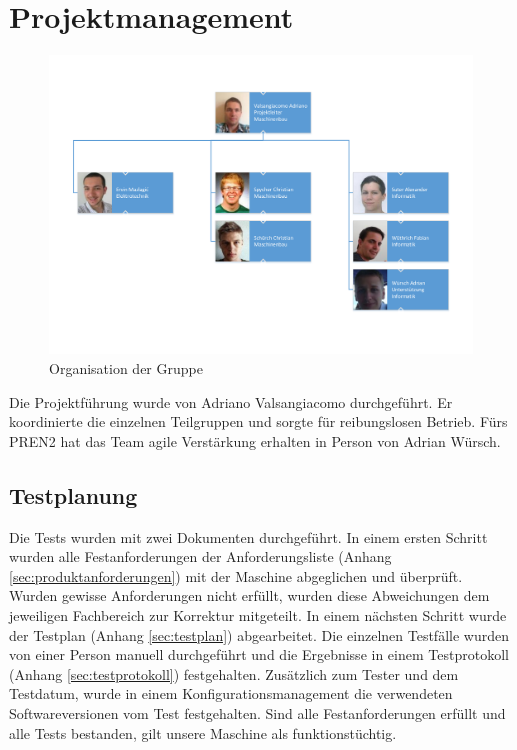 \section{Projektmanagement}

\begin{figure}[h!]
	\centering
	\includegraphics[width=1.0\linewidth]{../../fig/Organigramm.pdf}
	\caption{Organisation der Gruppe}
	\label{fig:Organigramm}
\end{figure}

\noindent
Die Projektführung wurde von Adriano Valsangiacomo durchgeführt. Er
koordinierte die einzelnen Teilgruppen und sorgte für reibungslosen
Betrieb. Fürs PREN2 hat das Team agile Verstärkung erhalten in Person von Adrian Würsch.

\newpage

\newpage

\newpage


\newpage

\subsection{Testplanung}

Die Tests wurden mit zwei Dokumenten durchgeführt. In einem ersten Schritt wurden alle Festanforderungen der Anforderungsliste (Anhang \ref{sec:produktanforderungen}) mit der Maschine abgeglichen und überprüft. Wurden gewisse Anforderungen nicht erfüllt, wurden diese Abweichungen dem jeweiligen Fachbereich zur Korrektur mitgeteilt. In einem nächsten Schritt wurde der Testplan (Anhang \ref{sec:testplan}) abgearbeitet. Die einzelnen Testfälle wurden von einer Person manuell durchgeführt und die Ergebnisse in einem Testprotokoll (Anhang \ref{sec:testprotokoll}) festgehalten. Zusätzlich zum Tester und dem Testdatum, wurde in einem Konfigurationsmanagement die verwendeten Softwareversionen vom Test festgehalten. Sind alle Festanforderungen erfüllt und alle Tests bestanden, gilt unsere Maschine als funktionstüchtig.

